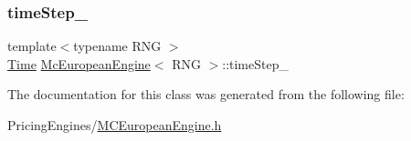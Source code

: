 \subsubsection{\texorpdfstring{time\+Step\+\_\+}{timeStep\_}}
{\footnotesize\ttfamily template$<$typename R\+NG $>$ \\
\hyperlink{_name_def_8h_ac2d3e0ba793497bcca555c7c2cf64ff3}{Time} \hyperlink{class_mc_european_engine}{Mc\+European\+Engine}$<$ R\+NG $>$\+::time\+Step\+\_\+\hspace{0.3cm}{\ttfamily [private]}}



The documentation for this class was generated from the following file\+:\begin{DoxyCompactItemize}
\item 
Pricing\+Engines/\hyperlink{_m_c_european_engine_8h}{M\+C\+European\+Engine.\+h}\end{DoxyCompactItemize}
